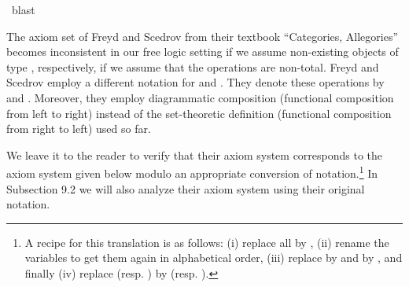 \begin{isabellebody}
\ blast%
\endisatagproof
{\isafoldproof}%
%
\isadelimproof
%
\endisadelimproof
%
\isamarkuptrue%
%
\begin{isamarkuptext}%
The axiom set of Freyd and Scedrov from their textbook
 ``Categories, Allegories'' \cite{FreydScedrov90} becomes inconsistent in our free logic setting if we assume 
  non-existing objects of type , respectively, if we assume that the operations are 
  non-total.  Freyd and Scedrov employ a different notation for 
   and . They denote these operations by  
  and . Moreover, they employ diagrammatic composition  
  (functional composition from left to right) instead of the set-theoretic 
  definition  (functional composition from right to left) used so far.
 
  We leave it to the reader to verify that their axiom system corresponds to the 
  axiom system given below modulo an appropriate conversion of notation.\footnote{A recipe for 
  this translation is as follows: (i) replace all  by , 
(ii) rename the variables to get them again in alphabetical order,
(iii) replace \isa{{\isasymphi}{\isasymbox}} by  and \isa{{\isasymbox}{\isasymphi}}  by , and finally
(iv) replace  (resp. ) 
   by  (resp. ).}
  In Subsection 9.2 we will also analyze their axiom system using their original notation.



\end{isamarkuptext}
\end{isabellebody}
